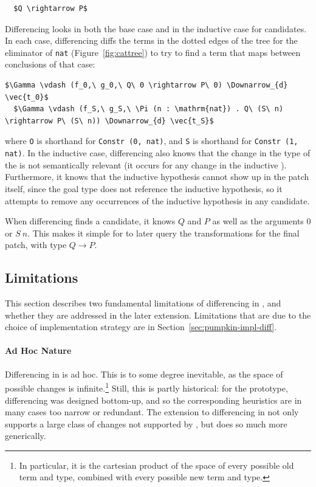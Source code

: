 \begin{lstlisting}
  $Q \rightarrow P$
\end{lstlisting}

Differencing looks in both the base case and in the inductive case for candidates.
In each case, differencing diffs the terms in the dotted edges of the tree for the eliminator of \lstinline{nat} (Figure~\ref{fig:cattree}) to
try to find a term that maps between conclusions of that case:

\begin{lstlisting}[language=coq]
  $\Gamma \vdash (f_0,\ g_0,\ Q\ 0 \rightarrow P\ 0) \Downarrow_{d} \vec{t_0}$
  $\Gamma \vdash (f_S,\ g_S,\ \Pi (n : \mathrm{nat}) . Q\ (S\ n) \rightarrow P\ (S\ n)) \Downarrow_{d} \vec{t_S}$
\end{lstlisting}
where \lstinline{O} is shorthand for \lstinline{Constr (0, nat)}, and \lstinline{S} is shorthand for \lstinline{Constr (1, nat)}.
In the inductive case, differencing also knows that the change in the type of the  is not semantically relevant (it occurs for any change in the inductive ).
Furthermore, it knows that the inductive hypothesis cannot show up in the patch itself, since the goal type does not reference the inductive hypothesis,
so it attempts to remove any occurrences of the inductive hypothesis in any candidate.

When differencing finds a candidate, it knows $Q$ and $P$ as well as the arguments $0$ or $S\ n$.
This makes it simple for \sysname to later query the transformations for the final patch, with type $Q \rightarrow P$.

\subsection{Limitations}
\label{sec:pumpkin-diff-limitations}


This section describes two fundamental limitations of differencing in \sysname,
and whether they are addressed in the later \toolnamec extension.
Limitations that are due to the choice of implementation strategy are in Section~\ref{sec:pumpkin-impl-diff}.

\paragraph{Ad Hoc Nature}
Differencing in \sysname is ad hoc.
This is to some degree inevitable, as the space of possible changes is infinite.\footnote{In particular, it is the cartesian product of the 
space of every possible old term and type,
combined with every possible new term and type.}
Still, this is partly historical: for the \sysname prototype, differencing was designed bottom-up, and so the corresponding heuristics
are in many cases too narrow or redundant.
The extension to differencing in \toolnamec not only supports a large class of changes not supported by \sysname,
but does so much more generically.


